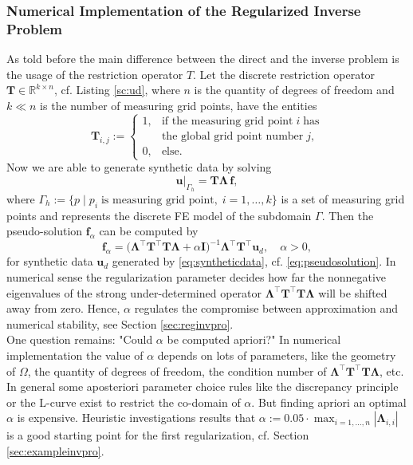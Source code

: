 \documentclass[a4paper, 11pt, twoside]{article}
\begin{document}
\subsubsection{Numerical Implementation of the Regularized Inverse Problem}\label{sec:numinvpro}
%
As told before the main difference between the direct and the inverse problem is the usage of the restriction operator $T$. Let the discrete restriction operator $\boldsymbol{T}\in\mathbb{R}^{k\times n}$, cf. Listing \ref{sc:ud}, where $n$ is the quantity of degrees of freedom and $k\ll n$ is the number of measuring grid points, have the entities
%
\begin{equation*}
\boldsymbol{T}_{i,j}:=\left\{\begin{array}{ll}
	1, & \text{if the measuring grid point}\;i\;\text{has}\\
	& \text{the global grid point number}\;j,\\
	0, & \text{else}.
	\end{array}\right.
\end{equation*}
%
Now we are able to generate synthetic data by solving
\begin{equation}\label{eq:syntheticdata}
	\boldsymbol{u}|_{\Gamma_h}=\boldsymbol{T\Lambda}\,\boldsymbol{f},
\end{equation}
%
where $\Gamma_h:=\{p\;|\;p_i\;\text{is measuring grid point},\;i=1,\ldots,k\}$ is a set of measuring grid points and represents the discrete FE model of the subdomain $\Gamma$. Then the pseudo-solution $\boldsymbol{f}_{\alpha}$ can be computed by
%
\begin{equation}\label{eq:pseudosolution2}
	\boldsymbol{f}_{\alpha}=\big(\boldsymbol{\Lambda}^\top\boldsymbol{T}^\top\boldsymbol{T\Lambda}
  +\alpha\boldsymbol{I}\big)^{-1}
  \boldsymbol{\Lambda}^\top\boldsymbol{T}^\top\boldsymbol{u}_d,\quad\alpha>0,
\end{equation}
%
for synthetic data $\boldsymbol{u}_d$ generated by \eqref{eq:syntheticdata}, cf. \eqref{eq:pseudosolution}. In numerical sense the regularization parameter decides how far the nonnegative eigenvalues of the strong under-determined operator $\boldsymbol{\Lambda}^\top\boldsymbol{T}^\top\boldsymbol{T\Lambda}$ will be shifted away from zero. Hence, $\alpha$ regulates the compromise between approximation and numerical stability, see Section \ref{sec:reginvpro}.\\

One question remains: "Could $\alpha$ be computed apriori?" In numerical implementation the value of $\alpha$ depends on lots of parameters, like the geometry of $\Omega$, the quantity of degrees of freedom, the condition number of $\boldsymbol{\Lambda}^\top\boldsymbol{T}^\top\boldsymbol{T\Lambda}$, etc. In general some aposteriori parameter choice rules like the discrepancy principle or the L-curve exist to restrict the co-domain of $\alpha$. But finding apriori an optimal $\alpha$ is expensive. Heuristic investigations results that $\alpha:=0.05\cdot\max_{i=1,\ldots,n}|\boldsymbol{\Lambda}_{i,i}|$ is a good starting point for the first regularization, cf. Section \ref{sec:exampleinvpro}.\\ 
\end{document}

